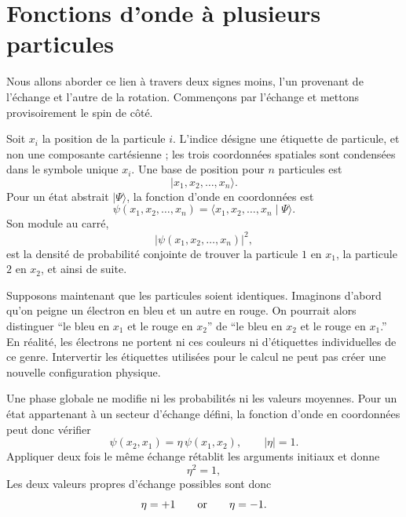 \section{Fonctions d’onde à plusieurs particules}

Nous allons aborder ce lien à travers deux signes moins, l’un provenant de l’échange et l’autre de la rotation. Commençons par l’échange et mettons provisoirement le spin de côté.

Soit \(x_i\) la position de la particule \(i\). L’indice désigne une étiquette de particule, et non une composante cartésienne ; les trois coordonnées spatiales sont condensées dans le symbole unique \(x_i\). Une base de position pour \(n\) particules est
\begin{equation}
\lvert x_1,x_2,\ldots,x_n\rangle.
\end{equation}
Pour un état abstrait \(\lvert\Psi\rangle\), la fonction d’onde en coordonnées est
\begin{equation}
\psi(x_1,x_2,\ldots,x_n)
=
\langle x_1,x_2,\ldots,x_n\mid\Psi\rangle.
\end{equation}
Son module au carré,
\begin{equation}
\bigl\lvert\psi(x_1,x_2,\ldots,x_n)\bigr\rvert^2,
\end{equation}
est la densité de probabilité conjointe de trouver la particule \(1\) en \(x_1\), la particule \(2\) en \(x_2\), et ainsi de suite.

Supposons maintenant que les particules soient identiques. Imaginons d’abord qu’on peigne un électron en bleu et un autre en rouge. On pourrait alors distinguer ``le bleu en \(x_1\) et le rouge en \(x_2\)'' de ``le bleu en \(x_2\) et le rouge en \(x_1\).'' En réalité, les électrons ne portent ni ces couleurs ni d’étiquettes individuelles de ce genre. Intervertir les étiquettes utilisées pour le calcul ne peut pas créer une nouvelle configuration physique.

Une phase globale ne modifie ni les probabilités ni les valeurs moyennes. Pour un état appartenant à un secteur d’échange défini, la fonction d’onde en coordonnées peut donc vérifier
\begin{equation}
\psi(x_2,x_1)=\eta\,\psi(x_1,x_2),
\qquad
\lvert\eta\rvert=1.
\end{equation}
Appliquer deux fois le même échange rétablit les arguments initiaux et donne
\begin{equation}
\eta^2=1,
\end{equation}
Les deux valeurs propres d’échange possibles sont donc
\begin{equation}
\eta=+1
\qquad\hbox{or}\qquad
\eta=-1.
\end{equation}

